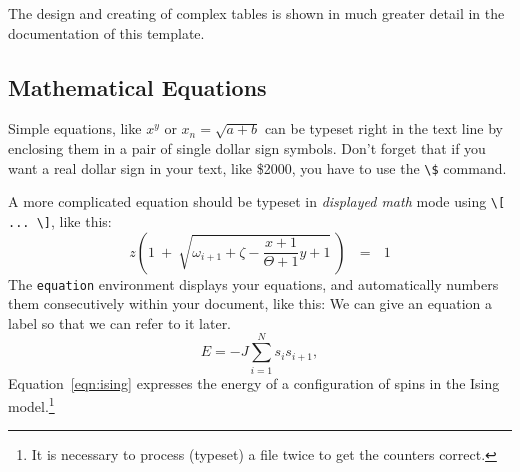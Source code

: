 The design and creating of complex tables is shown in much greater detail in the documentation of this template.

\subsection{Mathematical Equations}
\label{sec:example:math}

Simple equations, like $x^y$ or $x_n = \sqrt{a + b}$ can be typeset right
in the text line by enclosing them in a pair of single dollar sign symbols.
Don't forget that if you want a real dollar sign in your text, like \$2000,
you have to use the \verb+\$+ command.

A more complicated equation should be typeset in \emph{displayed math} mode using \texttt{\textbackslash{[} ... \textbackslash{]}}, like this:
%
\[
z \left( 1 \ +\  \sqrt{\omega_{i+1} + \zeta -\frac{x+1}{\Theta +1} y + 1} 
\ \right)
\ \ \ =\ \ \  1
\]
%
The \texttt{equation} environment displays your equations, and automatically
numbers them consecutively within your document, like this:
%
We can give an equation a label so that we can refer to it later.
\begin{equation}
  \label{eqn:ising}
  E = -J \sum_{i=1}^N s_i s_{i+1} ,
\end{equation}
Equation~\eqref{eqn:ising} expresses the energy of a configuration
of spins in the Ising model.\footnote{It is necessary to process (typeset) a
file twice to get the counters correct.}

